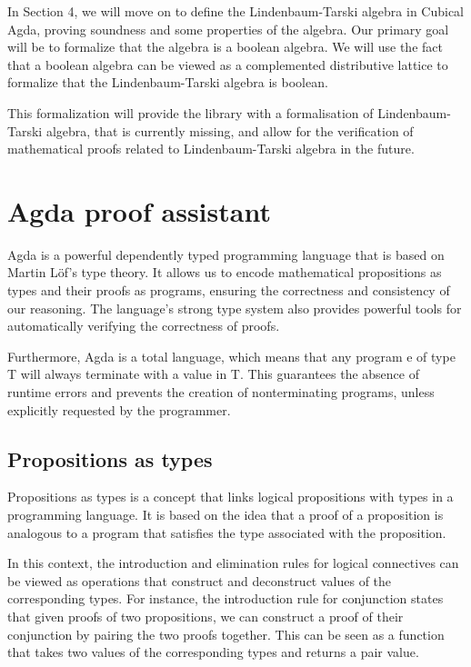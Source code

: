 \documentclass[titlepage]{article}
\begin{document}
In Section 4, we will move on to define the Lindenbaum-Tarski algebra in Cubical Agda, proving soundness and some properties of the algebra. Our primary goal will be to formalize that the algebra is a boolean algebra. We will use the fact that a boolean algebra can be viewed as a complemented distributive lattice to formalize that the Lindenbaum-Tarski algebra is boolean.

This formalization will provide the \agdaCubical library with a formalisation of Lindenbaum-Tarski algebra, that is currently missing, and allow for the verification of mathematical proofs related to Lindenbaum-Tarski algebra in the future.




\section{Agda proof assistant}

Agda is a powerful dependently typed programming language that is based on Martin Löf's type theory. It allows us to encode mathematical propositions as types and their proofs as programs, ensuring the correctness and consistency of our reasoning. The language's strong type system also provides powerful tools for automatically verifying the correctness of proofs.\cite{BoveDybjer2008}

Furthermore, Agda is a total language, which means that any program e of type T will always terminate with a value in T. This guarantees the absence of runtime errors and prevents the creation of nonterminating programs, unless explicitly requested by the programmer.\cite{AgdaDoc}


\subsection{Propositions as types}

Propositions as types is a concept that links logical propositions with types in a programming language. It is based on the idea that a proof of a proposition is analogous to a program that satisfies the type associated with the proposition.

In this context, the introduction and elimination rules for logical connectives can be viewed as operations that construct and deconstruct values of the corresponding types. For instance, the introduction rule for conjunction states that given proofs of two propositions, we can construct a proof of their conjunction by pairing the two proofs together. This can be seen as a function that takes two values of the corresponding types and returns a pair value.
\end{document}
